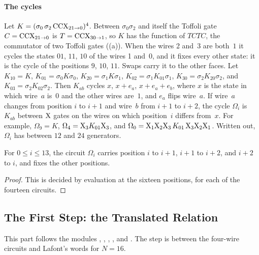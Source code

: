 \documentclass[acmsmall,screen,nonacm]{acmart}
\begin{document}
\paragraph{The cycles} Let $K=(\sigma_0\,\sigma_2\,\mathrm{CCX}_{21\to0})^4$. Between $\sigma_0\sigma_2$ and itself the Toffoli gate $C=\mathrm{CCX}_{21\to0}$ is $T=\mathrm{CCX}_{30\to1}$, so $K$ has the function of $TCTC$, the commutator of two Toffoli gates ((a)). When the wires 2 and~3 are both~$1$ it cycles the states $01$, $11$, $10$ of the wires 1 and~0, and it fixes every other state: it is the cycle of the positions $9$, $10$, $11$. Swaps carry it to the other faces. Let $K_{10}=K$, $K_{01}=\sigma_0K\sigma_0$, $K_{20}=\sigma_1K\sigma_1$, $K_{02}=\sigma_1K_{01}\sigma_1$, $K_{30}=\sigma_2K_{20}\sigma_2$, and $K_{03}=\sigma_2K_{02}\sigma_2$. Then $K_{ab}$ cycles $x$, $x+e_a$, $x+e_a+e_b$, where $x$ is the state in which wire~$a$ is~$0$ and the other wires are~$1$, and $e_a$ flips wire~$a$. If wire~$a$ changes from position $i$ to $i+1$ and wire~$b$ from $i+1$ to $i+2$, the cycle $\Omega_i$ is $K_{ab}$ between $\mathrm{X}$ gates on the wires on which position~$i$ differs from~$x$. For example, $\Omega_9=K$, $\Omega_4=\mathrm{X}_3K_{01}\mathrm{X}_3$, and $\Omega_0=\mathrm{X}_1\mathrm{X}_2\mathrm{X}_3\,K_{01}\,\mathrm{X}_3\mathrm{X}_2\mathrm{X}_1$. Written out, $\Omega_i$ has between $12$ and $24$ generators.

\begin{lemma}\label{lem:x-cycles}
For $0\le i\le13$, the circuit $\Omega_i$ carries position $i$ to $i+1$, $i+1$ to $i+2$, and $i+2$ to $i$, and fixes the other positions.
\end{lemma}

\begin{proof}
This is decided by evaluation at the sixteen positions, for each of the fourteen circuits.
\end{proof}

\subsection{The First Step: the Translated Relation}\label{app:xcxccx-first}

This part follows the modules , , , , and . The step is between the four-wire circuits and Lafont's words for $N=16$.
\end{document}
